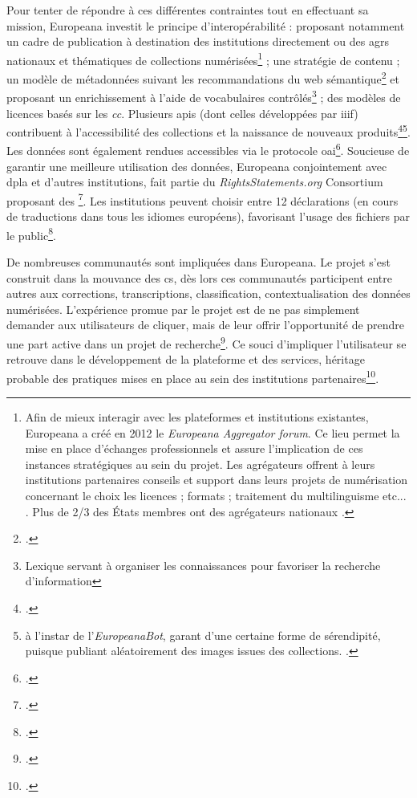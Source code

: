Pour tenter de répondre à ces différentes contraintes tout en effectuant sa mission, Europeana investit le principe d'interopérabilité : proposant notamment un cadre de publication à destination des institutions directement ou des \gls{agr}s nationaux et thématiques de collections numérisées\footnote{Afin de mieux interagir avec les plateformes et institutions existantes, Europeana a créé en 2012 le \textit{Europeana Aggregator forum}. Ce lieu permet la mise en place d'échanges professionnels et assure l'implication de ces instances stratégiques au sein du projet. Les agrégateurs offrent à leurs institutions partenaires conseils et support dans leurs projets de numérisation concernant le choix les licences ; formats ;  traitement du multilinguisme etc... \cite{europeana_breathing_nodate}. Plus de 2/3 des États membres ont des agrégateurs nationaux \cite{noauthor_european_2019}.} ; une stratégie de contenu ; un modèle de métadonnées suivant les recommandations du web sémantique\footcite{europeana_linked_nodate-1} et proposant un enrichissement à l'aide de vocabulaires contrôlés\footnote{Lexique servant à organiser les connaissances pour favoriser la recherche d'information} ;  des modèles de licences basés sur les \textit{\gls{cc}}. Plusieurs \gls{api}s (dont celles développées par \gls{iiif}) contribuent à l'accessibilité des collections et la naissance de nouveaux produits\footcite{roued-cunliffe_participatory_2017}\footnote{à l'instar de l'\textit{EuropeanaBot}, garant d'une certaine forme de sérendipité, puisque publiant aléatoirement des images issues des collections. \cite{noauthor_europeana_nodate}.}. Les données sont également rendues accessibles via le protocole \gls{oai}\footcite{europeana_everything_nodate}. Soucieuse de garantir une meilleure utilisation des données, Europeana conjointement avec \gls{dpla} et d'autres institutions, fait partie du \textit{RightsStatements.org} Consortium proposant des \footcite{noauthor_rightsstatements.org_nodate}. Les institutions peuvent choisir entre 12 déclarations (en cours de traductions dans tous les idiomes européens), favorisant l'usage des fichiers par le public\footcite{noauthor_european_2019}. 

De nombreuses communautés sont impliquées dans Europeana. Le projet s'est construit dans la mouvance des \gls{cs}, dès lors ces communautés participent entre autres aux corrections, transcriptions, classification, contextualisation des données numérisées. L'expérience promue par le projet est de ne pas simplement demander aux utilisateurs de cliquer, mais de leur offrir l'opportunité de prendre une part active dans un projet de recherche\footcite{thylstrup_politics_2018}. Ce souci d'impliquer l'utilisateur se retrouve dans le développement de la plateforme et des services, héritage probable des pratiques mises en place au sein des institutions partenaires\footcite{jones_public_2017}. 

